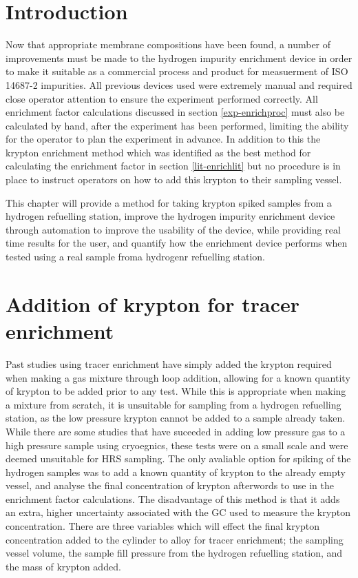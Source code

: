 \section{Introduction}
Now that appropriate membrane compositions have been found, a number of improvements must be made to the hydrogen impurity enrichment device in order to make it suitable as a commercial process and product for measuerment of ISO 14687-2 impurities. All previous devices used were extremely manual and required close operator attention to ensure the experiment performed correctly. All enrichment factor calculations discussed in section \ref{exp-enrichproc} must also be calculated by hand, after the experiment has been performed, limiting the ability for the operator to plan the experiment in advance. In addition to this the krypton enrichment method which was identified as the best method for calculating the enrichment factor in section \ref{lit-enrichlit} but no procedure is in place to instruct operators on how to add this krypton to their sampling vessel. 

This chapter will provide a method for taking krypton spiked samples from a hydrogen refuelling station, improve the hydrogen impurity enrichment device through automation to improve the usability of the device, while providing real time results for the user, and quantify how the enrichment device performs when tested using a real sample froma  hydrogenr refuelling station. 

\section{Addition of krypton for tracer enrichment}\label{kryptonspike}
Past studies using tracer enrichment have simply added the krypton required when making a gas mixture through loop addition,\cite{Murugan2014} allowing for a known quantity of krypton to be added prior to any test. While this is appropriate when making a mixture from scratch, it is unsuitable for sampling from a hydrogen refuelling station, as the low pressure krypton cannot be added to a sample already taken. While there are some studies that have suceeded in adding low pressure gas to a high pressure sample using cryoegnics,\cite{Podesta2017} these tests were on a small scale and were deemed unsuitable for HRS sampling. The only avaliable option for spiking of the hydrogen samples was to add a known quantity of krypton to the already empty vessel, and analyse the final concentration of krypton afterwords to use in the enrichment factor calculations. The disadvantage of this method is that it adds an extra, higher uncertainty associated with the GC used to measure the krypton concentration. There are three variables which will effect the final krypton concentration added to the cylinder to alloy for tracer enrichment; the sampling vessel volume, the sample fill pressure from the hydrogen refuelling station, and the mass of krypton added.  

